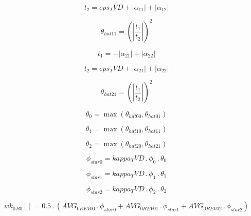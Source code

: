 \documentclass{article}
\begin{document}
\begin{dmath}t_{2} = eps_TVD + \left|{\alpha_{11}}\right| + \left|{\alpha_{12}}\right|\end{dmath}

\begin{dmath}\theta_{hat 11} = \left(\left|{\frac{t_{1}}{t_{2}}}\right| \right)^{2}\end{dmath}

\begin{dmath}t_{1} = - \left|{\alpha_{21}}\right| + \left|{\alpha_{22}}\right|\end{dmath}

\begin{dmath}t_{2} = eps_TVD + \left|{\alpha_{21}}\right| + \left|{\alpha_{22}}\right|\end{dmath}

\begin{dmath}\theta_{hat 21} = \left(\left|{\frac{t_{1}}{t_{2}}}\right| \right)^{2}\end{dmath}

\begin{dmath}\theta_{0} = \max\left(\theta_{hat 00}, \theta_{hat 01}\right)\end{dmath}

\begin{dmath}\theta_{1} = \max\left(\theta_{hat 10}, \theta_{hat 11}\right)\end{dmath}

\begin{dmath}\theta_{2} = \max\left(\theta_{hat 20}, \theta_{hat 21}\right)\end{dmath}

\begin{dmath}\phi_{star 0} = kappa_TVD \,.\, \phi_{0} \,.\, \theta_{0}\end{dmath}

\begin{dmath}\phi_{star 1} = kappa_TVD \,.\, \phi_{1} \,.\, \theta_{1}\end{dmath}

\begin{dmath}\phi_{star 2} = kappa_TVD \,.\, \phi_{2} \,.\, \theta_{2}\end{dmath}

\begin{dmath}{wk_{0}{_{B0}}}[{}] = 0.5 \,.\, \left(AVG_{0 REV 00} \,.\, \phi_{star 0} + AVG_{0 REV 01} \,.\, \phi_{star 1} + AVG_{0 REV 02} \,.\, \phi_{star 2}\right)\end{dmath}
\end{document}
